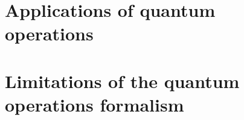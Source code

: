 \section{Applications of quantum operations}

\ex \todo

\ex \todo

\ex \todo

\ex \todo

\section{Limitations of the quantum operations formalism}